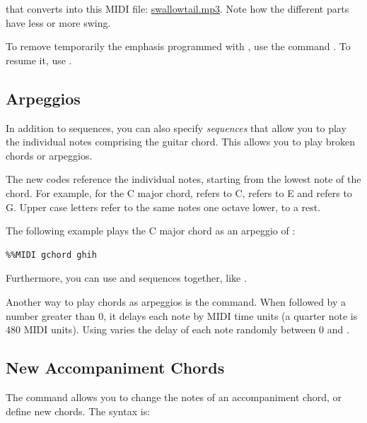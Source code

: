 \documentclass[a4paper,12pt]{book}
\begin{document}
that converts into this MIDI file:
\href{run:swallowtail.mp3}{swallowtail.mp3}. Note how the different parts
have less or more swing.

To remove temporarily the emphasis programmed with , use the command . To resume it,
use .


\subsection{Arpeggios}
\label{sec:arpeggios}

In addition to  sequences, you can also specify
\emph{ sequences} that allow you to play the individual
notes comprising the guitar chord. This allows you to play broken
chords or arpeggios.

The new codes  reference the individual notes, starting
from the lowest note of the chord. For example, for the C major chord,
 refers to C,  refers to E and  refers to G.
Upper case letters refer to the same notes one octave lower, 
to a rest.

The following example plays the C major chord as an arpeggio of
:

\begin{verbatim}
%%MIDI gchord ghih
\end{verbatim}

Furthermore, you can use  and  sequences together,
like .

Another way to play chords as arpeggios is the  command. When followed by a number  greater than
0, it delays each note by  MIDI time units (a quarter note is
480 MIDI units). Using  
varies the delay of each note randomly between 0 and .





\subsection{New Accompaniment Chords}
\label{sec:newacc}

The  command allows you to change the notes of
an accompaniment chord, or define new chords. The syntax is:
\end{document}
